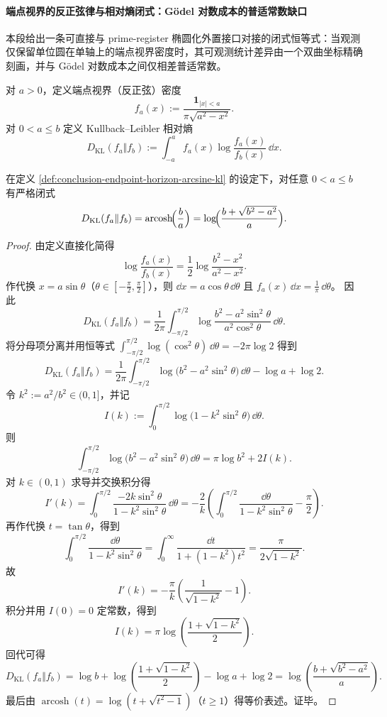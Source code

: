 \paragraph{端点视界的反正弦律与相对熵闭式：Gödel 对数成本的普适常数缺口}\label{par:conclusion-endpoint-horizon-arcsine-relative-entropy}
本段给出一条可直接与 prime-register 椭圆化外置接口对接的闭式恒等式：当观测仅保留单位圆在单轴上的端点视界密度时，其可观测统计差异由一个双曲坐标精确刻画，并与 Gödel 对数成本之间仅相差普适常数。

\begin{definition}\label{def:conclusion-endpoint-horizon-arcsine-kl}
对 \(a>0\)，定义端点视界（反正弦）密度
\[
f_a(x):=\frac{\mathbf 1_{|x|<a}}{\pi\sqrt{a^2-x^2}}.
\]
对 \(0<a\le b\) 定义 Kullback--Leibler 相对熵
\[
D_{\mathrm{KL}}(f_a\Vert f_b):=\int_{-a}^{a} f_a(x)\log\frac{f_a(x)}{f_b(x)}\,\dd x.
\]
\end{definition}

\begin{theorem}[端点视界相对熵的反双曲闭式]\label{thm:conclusion-endpoint-horizon-arcsine-kl-closed-form}
在定义 \ref{def:conclusion-endpoint-horizon-arcsine-kl} 的设定下，对任意 \(0<a\le b\) 有严格闭式
\[
D_{\mathrm{KL}}(f_a\Vert f_b)
=\operatorname{arcosh}\!\Bigl(\frac{b}{a}\Bigr)
=\log\!\Bigl(\frac{b+\sqrt{b^2-a^2}}{a}\Bigr).
\]
\end{theorem}

\begin{proof}
由定义直接化简得
\[
\log\frac{f_a(x)}{f_b(x)}=\frac12\log\frac{b^2-x^2}{a^2-x^2}.
\]
作代换 \(x=a\sin\theta\)（\(\theta\in[-\tfrac\pi2,\tfrac\pi2]\)），则 \(\dd x=a\cos\theta\,\dd\theta\) 且
\(
f_a(x)\,\dd x=\frac{1}{\pi}\,\dd\theta
\)。
因此
\[
D_{\mathrm{KL}}(f_a\Vert f_b)
=\frac{1}{2\pi}\int_{-\pi/2}^{\pi/2}\log\frac{b^2-a^2\sin^2\theta}{a^2\cos^2\theta}\,\dd\theta.
\]
将分母项分离并用恒等式
\(
\int_{-\pi/2}^{\pi/2}\log(\cos^2\theta)\,\dd\theta=-2\pi\log 2
\)
得到
\[
D_{\mathrm{KL}}(f_a\Vert f_b)
=\frac{1}{2\pi}\int_{-\pi/2}^{\pi/2}\log\!\bigl(b^2-a^2\sin^2\theta\bigr)\,\dd\theta
-\log a+\log 2.
\]
令 \(k^2:=a^2/b^2\in(0,1]\)，并记
\[
I(k):=\int_{0}^{\pi/2}\log\!\bigl(1-k^2\sin^2\theta\bigr)\,\dd\theta.
\]
则
\[
\int_{-\pi/2}^{\pi/2}\log\!\bigl(b^2-a^2\sin^2\theta\bigr)\,\dd\theta
=\pi\log b^2+2I(k).
\]
对 \(k\in(0,1)\) 求导并交换积分得
\[
I'(k)=\int_0^{\pi/2}\frac{-2k\sin^2\theta}{1-k^2\sin^2\theta}\,\dd\theta
=-\frac{2}{k}\left(\int_0^{\pi/2}\frac{\dd\theta}{1-k^2\sin^2\theta}-\frac{\pi}{2}\right).
\]
再作代换 \(t=\tan\theta\)，得到
\[
\int_0^{\pi/2}\frac{\dd\theta}{1-k^2\sin^2\theta}
=\int_0^\infty \frac{\dd t}{1+(1-k^2)t^2}
=\frac{\pi}{2\sqrt{1-k^2}}.
\]
故
\[
I'(k)=-\frac{\pi}{k}\left(\frac{1}{\sqrt{1-k^2}}-1\right).
\]
积分并用 \(I(0)=0\) 定常数，得到
\[
I(k)=\pi\log\!\left(\frac{1+\sqrt{1-k^2}}{2}\right).
\]
回代可得
\[
D_{\mathrm{KL}}(f_a\Vert f_b)
=\log b+\log\!\left(\frac{1+\sqrt{1-k^2}}{2}\right)-\log a+\log 2
=\log\!\left(\frac{b+\sqrt{b^2-a^2}}{a}\right).
\]
最后由 \(\operatorname{arcosh}(t)=\log(t+\sqrt{t^2-1})\)（\(t\ge 1\)）得等价表述。证毕。
\end{proof}

